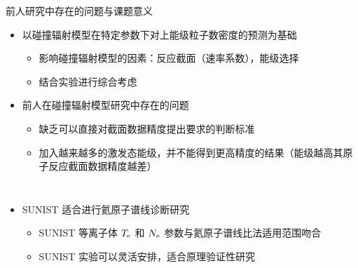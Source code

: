 \begin{CJK*}{UTF8}{kai}
\begin{frame}{前人研究中存在的问题与课题意义}
	\begin{itemize}
		\item 以碰撞辐射模型在特定参数下对上能级粒子数密度的预测为基础
			\begin{itemize}
				\item 影响碰撞辐射模型的因素：反应截面（速率系数），能级选择
				\item 结合实验进行综合考虑%
			\end{itemize}
		\item 前人在碰撞辐射模型研究中存在的问题
			\begin{itemize}
				\item 缺乏可以直接对截面数据精度提出要求的判断标准%
				\item 加入越来越多的激发态能级，并不能得到更高精度的结果（能级越高其原子反应截面数据精度越差）
			\end{itemize}
	\end{itemize}
	\vspace{-1.2em}
	\pause
	\begin{columns}
	\begin{itemize}
		\item SUNIST 适合进行氦原子谱线诊断研究
			\begin{itemize}
				\item SUNIST 等离子体 $T_{\rm e}$ 和 $N_{\rm e}$ 参数与氦原子谱线比法适用范围吻合
				\item SUNIST 实验可以灵活安排，适合原理验证性研究
			\end{itemize}
	\end{itemize}
\end{columns}
\end{frame}
\end{CJK*}
